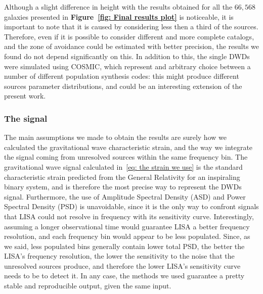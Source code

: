 Although a slight difference in height with the results obtained for all the $66,568$ galaxies presented in \textbf{Figure~\ref{fig: Final results plot}} is noticeable, it is important to note that it is caused by considering less then a third of the sources.
Therefore, even if it is possible to consider different and more complete catalogs, and the zone of avoidance could be estimated with better precision, the results we found do not depend significantly on this.
In addition to this, the single DWDs were simulated using COSMIC, which represent and arbitrary choice between a number of different population synthesis codes: this might produce different sources parameter distributions, and could be an interesting extension of the present work.

\subsubsection{The signal}
The main assumptions we made to obtain the results are surely how we calculated the gravitational wave characteristic strain, and the way we integrate the signal coming from unresolved sources within the same frequency bin.
The gravitational wave signal calculated in~\eqref{eq: the strain we use} is the standard characteristic strain predicted from the General Relativity for an inspiraling binary system, and is therefore the most precise way to represent the DWDs signal.
Furthermore, the use of Amplitude Spectral Density (ASD) and Power Spectral Density (PSD) is unavoidable, since it is the only way to confront signals that LISA could not resolve in frequency with its sensitivity curve.
Interestingly, assuming a longer observational time would guarantee LISA a better frequency resolution, and each frequency bin would appear to be less populated.
Since, as we said, less populated bins generally contain lower total PSD, the better the LISA's frequency resolution, the lower the sensitivity to the noise that the unresolved sources produce, and therefore the lower LISA's sensitivity curve needs to be to detect it.
In any case, the methods we used guarantee a pretty stable and reproducible output, given the same input.


